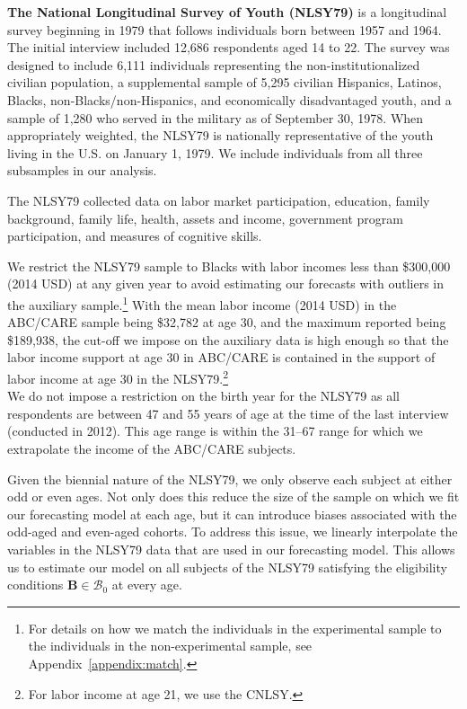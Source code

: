 \noindent\textbf{The National Longitudinal Survey of Youth (NLSY79)} is a longitudinal survey beginning in 1979 that follows individuals born between 1957 and 1964. The initial interview included 12,686 respondents aged 14 to 22. The survey was designed to include 6,111 individuals representing the non-institutionalized civilian population, a supplemental sample of 5,295 civilian Hispanics, Latinos, Blacks, non-Blacks/non-Hispanics, and economically disadvantaged youth, and a sample of 1,280 who served in the military as of September 30, 1978. When appropriately weighted, the NLSY79 is nationally representative of the youth living in the U.S. on January 1, 1979. We include individuals from all three subsamples in our analysis.

\noindent The NLSY79 collected data on labor market participation, education, family background, family life, health, assets and income, government program participation, and measures of cognitive skills.

\noindent We restrict the NLSY79 sample to Blacks with labor incomes less than \$300,000 (2014 USD) at any given year to avoid estimating our forecasts with outliers in the auxiliary sample.\footnote{For details on how we match the individuals in the experimental sample to the individuals in the non-experimental sample, see Appendix~\ref{appendix:match}.} With the mean labor income (2014 USD) in the ABC/CARE sample being \$32,782 at age 30, and the maximum reported being \$189,938, the cut-off we impose on the auxiliary data is high enough so that the labor income support at age 30 in ABC/CARE is contained in the support of labor income at age 30 in the NLSY79.\footnote{For labor income at age 21, we use the CNLSY.}\\

\noindent We do not impose a restriction on the birth year for the NLSY79 as all respondents are between 47 and 55 years of age at the time of the last interview (conducted in 2012). This age range is within the 31--67 range for which we extrapolate the income of the ABC/CARE subjects.

\noindent Given the biennial nature of the NLSY79, we only observe each subject at either odd or even ages. Not only does this reduce the size of the sample on which we fit our forecasting model at each age, but it can introduce biases associated with the odd-aged and even-aged cohorts. To address this issue, we linearly interpolate the variables in the NLSY79 data that are used in our forecasting model. This allows us to estimate our model on all subjects of the NLSY79 satisfying the eligibility conditions $\bm{B}\in\mathcal{B}_0$ at every age.

